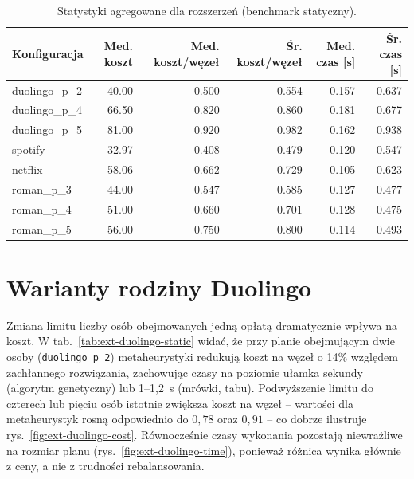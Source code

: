 \begin{table}[H]
  \centering
  \caption{Statystyki agregowane dla rozszerzeń (benchmark statyczny).}
  \label{tab:ext-overall-static}
  \begin{tabular}{lrrrrr}
    \toprule
    \textbf{Konfiguracja} & \textbf{Med. koszt} & \textbf{Med. koszt/węzeł} & \textbf{Śr. koszt/węzeł} & \textbf{Med. czas [s]} & \textbf{Śr. czas [s]} \\
    \midrule
    duolingo\_p\_2        & 40.00               & 0.500                     & 0.554                    & 0.157                  & 0.637                 \\
    duolingo\_p\_4        & 66.50               & 0.820                     & 0.860                    & 0.181                  & 0.677                 \\
    duolingo\_p\_5        & 81.00               & 0.920                     & 0.982                    & 0.162                  & 0.938                 \\
    spotify               & 32.97               & 0.408                     & 0.479                    & 0.120                  & 0.547                 \\
    netflix               & 58.06               & 0.662                     & 0.729                    & 0.105                  & 0.623                 \\
    roman\_p\_3           & 44.00               & 0.547                     & 0.585                    & 0.127                  & 0.477                 \\
    roman\_p\_4           & 51.00               & 0.660                     & 0.701                    & 0.128                  & 0.475                 \\
    roman\_p\_5           & 56.00               & 0.750                     & 0.800                    & 0.114                  & 0.493                 \\
  \end{tabular}
\end{table}

\section{Warianty rodziny Duolingo}

Zmiana limitu liczby osób obejmowanych jedną opłatą dramatycznie wpływa na koszt. W tab.~\ref{tab:ext-duolingo-static} widać, że przy planie obejmującym dwie osoby (\texttt{duolingo\_p\_2}) metaheurystyki redukują koszt na węzeł o 14\% względem zachłannego rozwiązania, zachowując czasy na poziomie ułamka sekundy (algorytm genetyczny) lub 1--1,2~s (mrówki, tabu). Podwyższenie limitu do czterech lub pięciu osób istotnie zwiększa koszt na węzeł -- wartości dla metaheurystyk rosną odpowiednio do $0{,}78$ oraz $0{,}91$ -- co dobrze ilustruje rys.~\ref{fig:ext-duolingo-cost}. Równocześnie czasy wykonania pozostają niewrażliwe na rozmiar planu (rys.~\ref{fig:ext-duolingo-time}), ponieważ różnica wynika głównie z ceny, a nie z trudności rebalansowania.

